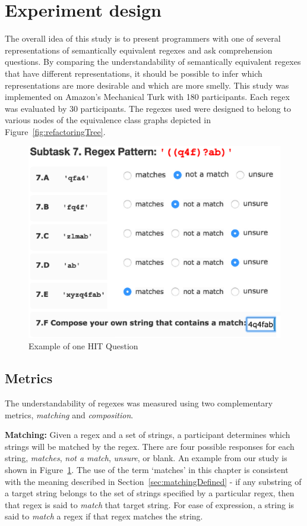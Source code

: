 
\section{Experiment design}

The overall idea of this study is to present programmers with one of several representations of semantically equivalent regexes and ask comprehension questions. By comparing the understandability of semantically equivalent regexes that have different representations, it should be possible to infer which representations are more desirable and which are more smelly.
This study was implemented on Amazon's Mechanical Turk with 180 participants.  Each regex was evaluated by 30 participants.
The regexes used were designed to belong to various nodes of the equivalence class graphs depicted in Figure~\ref{fig:refactoringTree}.

\begin{figure}[tb]
\centering
\includegraphics[width=0.8\columnwidth]{nontex/illustrations/exampleQuestion.eps}
\vspace{-12pt}
\caption{Example of one HIT Question}
\vspace{-6pt}
\label{fig:exampleQuestion}
\end{figure}



\subsection{Metrics}
The understandability of regexes was measured using two complementary metrics, \emph{matching} and \emph{composition}.

\textbf{Matching:}
Given a regex and a set of strings, a participant determines which strings will be matched by the regex. There are four possible responses for each string, \emph{matches}, \emph{not a match}, \emph{unsure}, or blank. An example from our study is shown in Figure~\ref{fig:exampleQuestion}.  The use of the term `matches' in this chapter is consistent with the meaning described in Section~\ref{sec:matchingDefined} - if any substring of a target string belongs to the set of strings specified by a particular regex, then that regex is said to \emph{match} that target string.  For ease of expression, a string is said to \emph{match} a regex if that regex matches the string.

